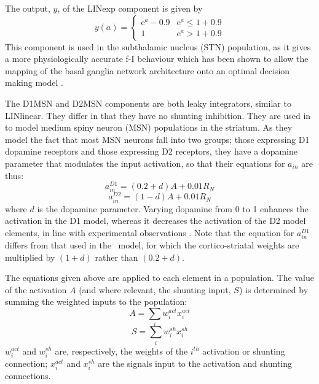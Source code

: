 The output, $y$, of the LINexp component is given by
\begin{equation}
   y(a) = \begin{cases}
      \mathrm{e}^{a}-0.9   & \mathrm{e}^a \leq 1+0.9 \\
      1   & \mathrm{e}^a > 1+0.9
   \end{cases}
\end{equation}
This component is used in the subthalamic nucleus (STN) population, as it gives a more
physiologically accurate f-I
behaviour \citep{wilson_model_2004,bevan_mechanisms_1999,hallworth_apamin-sensitive_2003}
which has been shown to allow the mapping of the basal ganglia network
architecture onto an optimal decision making
model \citep{bogacz_basal_2007}.

The D1MSN and D2MSN components are both leaky integrators, similar to
LINlinear. They differ in that they have no shunting inhibition. They
are used in to model medium spiny neuron (MSN) populations in
the striatum. As they model
the fact that most MSN neurons fall into two groups; those expressing D1
dopamine receptors and those expressing D2 receptors, they have a
dopamine parameter that modulates the input activation, so
that their equations for $a_{in}$ are thus:
\begin{equation}
   a_{in}^{D1} = (0.2 + d)A + 0.01 R_N
\end{equation}
\begin{equation}
   a_{in}^{D2} = (1 - d)A + 0.01 R_N
\end{equation}
where $d$ is the dopamine parameter. Varying dopamine from 0 to 1
enhances the activation in the D1 model, whereas it decreases
the activation of the D2 model elements, in line with experimental
observations \citep{harsing_influence_1997,gonon_prolonged_1997}.
Note that the equation for $a_{in}^{D1}$
differs from that used in the \ccg~model, for which the
cortico-striatal weights are multiplied by $(1+d)$ rather than
$(0.2+d)$.

The equations given above are applied to each element in a
population. The value of the activation $A$ (and where relevant, the
shunting input, $S$) is determined by summing the weighted
inputs to the population:
\begin{equation}
A = \sum_{i}w_i^{act} x_i^{act}
\end{equation}
\begin{equation}
S = \sum_{i}w_i^{sh} x_i^{sh}
\end{equation}
$w_i^{act}$ and $w_i^{sh}$ are, respectively, the weights
of the $i^{th}$ activation or shunting connection; $x_i^{act}$
and $x_i^{sh}$ are the signals input to the
activation and shunting connections.

